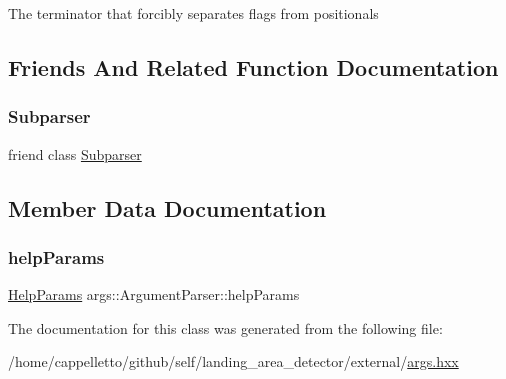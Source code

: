 The terminator that forcibly separates flags from positionals 

\subsection{Friends And Related Function Documentation}
\mbox{\label{classargs_1_1_argument_parser_aecbd7c0572cb2d7fecb5eff79552c203}} 
\subsubsection{\texorpdfstring{Subparser}{Subparser}}
{\footnotesize\ttfamily friend class \hyperlink{classargs_1_1_subparser}{Subparser}\hspace{0.3cm}{\ttfamily [friend]}}



\subsection{Member Data Documentation}
\mbox{\label{classargs_1_1_argument_parser_a0b78172b72e892a6776d2d7dec8e8b46}} 
\subsubsection{\texorpdfstring{help\+Params}{helpParams}}
{\footnotesize\ttfamily \hyperlink{structargs_1_1_help_params}{Help\+Params} args\+::\+Argument\+Parser\+::help\+Params}



The documentation for this class was generated from the following file\+:\begin{DoxyCompactItemize}
\item 
/home/cappelletto/github/self/landing\+\_\+area\+\_\+detector/external/\hyperlink{args_8hxx}{args.\+hxx}\end{DoxyCompactItemize}
